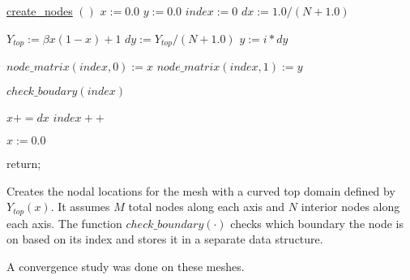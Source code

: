 \documentclass[a4paper, 12pt]{article}
\begin{document}
\begin{algorithm}[H]
  \underline{create\_nodes} $()$
  \BlankLine
  $x := 0.0$ \;
  $y := 0.0$ \;
  $index := 0$ \;
  $dx := 1.0 / (N+1.0)$\;
  {
    {
      $Y_{top} := \beta x (1-x) + 1$\;
      $dy := Y_{top} / (N+1.0)$\;
      $y := i * dy$\;

      $node\_matrix( index, 0) := x$\;
      $node\_matrix( index, 1) := y$\;

      $check\_boudary( index)$\;

      $x += dx$\;
      $index++$\;
    }
    $x := 0.0$\;
  }
  return;
  \caption{Creates the nodal locations for the mesh with 
           a curved top domain defined by $Y_{top}(x)$. 
           It assumes $M$ total nodes along each axis 
           and $N$ interior nodes along each axis.
           The function $check\_boundary(\cdot)$ checks
           which boundary the node is on based on its index
           and stores it in a separate data structure.}
  \label{al:create_nodes}
\end{algorithm}
\vspace{\baselineskip}



A convergence study was done on these meshes.

\end{document}
